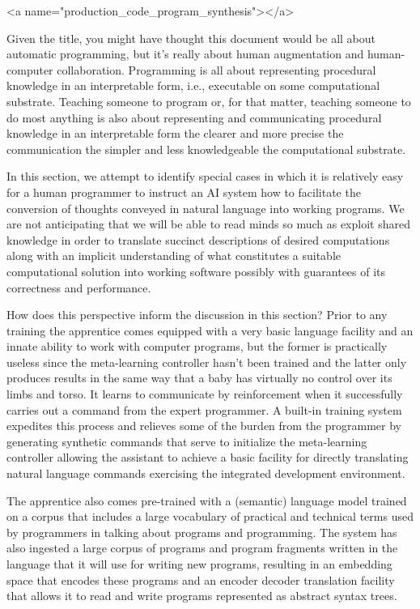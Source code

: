 
\rawhtml
<a name="production_code_program_synthesis"></a>
\endrawhtml
{}


Given the title, you might have thought this document would be all about automatic programming, but it's really about human augmentation and human-computer collaboration. Programming is all about representing procedural knowledge in an interpretable form, i.e., executable on some computational substrate. Teaching someone to program or, for that matter, teaching someone to do most anything is also about representing and communicating procedural knowledge in an interpretable form \emdash{} the clearer and more precise the communication the simpler and less knowledgeable the computational substrate.

In this section, we attempt to identify special cases in which it is relatively easy for a human programmer to instruct an AI system how to facilitate the conversion of thoughts conveyed in natural language into working programs. We are not anticipating that we will be able to read minds so much as exploit shared knowledge in order to translate succinct descriptions of desired computations \emdash{} along with an implicit understanding of what constitutes a suitable computational solution \emdash{} into working software possibly with guarantees of its correctness and performance.

How does this perspective inform the discussion in this section? Prior to any training the apprentice comes equipped with a very basic language facility and an innate ability to work with computer programs, but the former is practically useless since the meta-learning controller hasn't been trained and the latter only produces results in the same way that a baby has virtually no control over its limbs and torso. It learns to communicate by reinforcement when it successfully carries out a command from the expert programmer. A built-in training system expedites this process and relieves some of the burden from the programmer by generating synthetic commands that serve to initialize the meta-learning controller allowing the assistant to achieve a basic facility for directly translating natural language commands exercising the integrated development environment.

The apprentice also comes pre-trained with a (semantic) language model trained on a corpus that includes a large vocabulary of practical and technical terms used by programmers in talking about programs and programming. The system has also ingested a large corpus of programs and program fragments written in the language that it will use for writing new programs, resulting in an embedding space that encodes these programs and an encoder decoder translation facility that allows it to read and write programs represented as abstract syntax trees.

